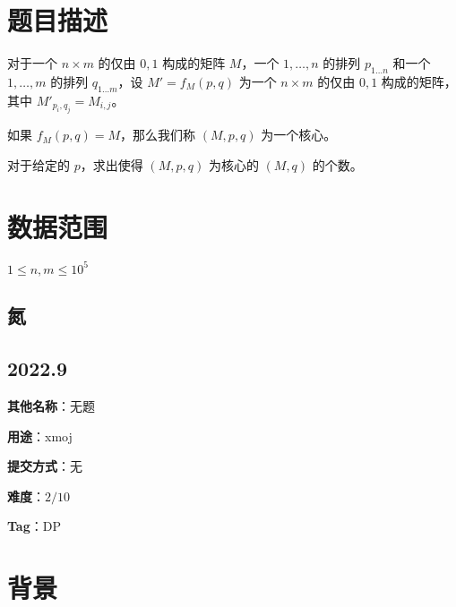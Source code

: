 \documentclass[a4paper,10pt]{article}
\begin{document}
\section*{题目描述}

对于一个 $n\times m$ 的仅由 $0,1$ 构成的矩阵 $M$，一个 $1,\ldots,n$ 的排列 $p_{1\ldots n}$ 和一个 $1,\ldots,m$ 的排列 $q_{1\ldots m}$，设 $M'=f_M(p,q)$ 为一个 $n\times m$ 的仅由 $0,1$ 构成的矩阵，其中 $M'_{p_i,q_j}=M_{i,j}$。

如果 $f_M(p,q)=M$，那么我们称 $(M,p,q)$ 为一个核心。

对于给定的 $p$，求出使得 $(M,p,q)$ 为核心的 $(M,q)$ 的个数。

\section*{数据范围}

$1\leq n,m\leq 10^5$

\newpage

\vspace*{\fill}
\begin{center}

\section{氮}

\subsection*{2022.9}

\vspace{10pt}

\textbf{其他名称}：无题

\vspace{10pt}

\textbf{用途}：xmoj

\vspace{10pt}

\textbf{提交方式}：无

\vspace{10pt}

\textbf{难度}：$2/10$

\vspace{10pt}

\textbf{Tag}：DP

\end{center}
\vspace*{\fill}

\newpage

\section*{背景}
\end{document}
